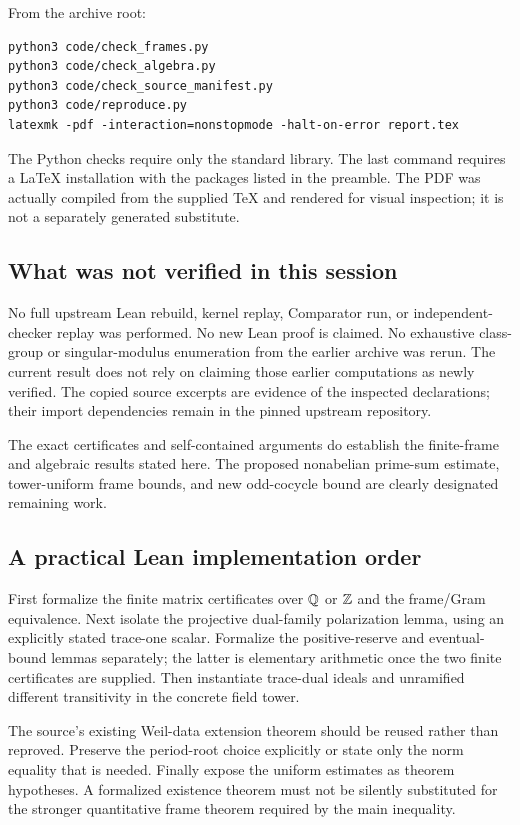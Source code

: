 From the archive root:
\begin{verbatim}
python3 code/check_frames.py
python3 code/check_algebra.py
python3 code/check_source_manifest.py
python3 code/reproduce.py
latexmk -pdf -interaction=nonstopmode -halt-on-error report.tex
\end{verbatim}
The Python checks require only the standard library. The last command requires a LaTeX installation with the packages listed in the preamble. The PDF was actually compiled from the supplied TeX and rendered for visual inspection; it is not a separately generated substitute.

\subsection{What was not verified in this session}

No full upstream Lean rebuild, kernel replay, Comparator run, or independent-checker replay was performed. No new Lean proof is claimed. No exhaustive class-group or singular-modulus enumeration from the earlier archive was rerun. The current result does not rely on claiming those earlier computations as newly verified. The copied source excerpts are evidence of the inspected declarations; their import dependencies remain in the pinned upstream repository.

The exact certificates and self-contained arguments do establish the finite-frame and algebraic results stated here. The proposed nonabelian prime-sum estimate, tower-uniform frame bounds, and new odd-cocycle bound are clearly designated remaining work.

\subsection{A practical Lean implementation order}

First formalize the finite matrix certificates over $\mathbb Q$ or $\mathbb Z$ and the frame/Gram equivalence. Next isolate the projective dual-family polarization lemma, using an explicitly stated trace-one scalar. Formalize the positive-reserve and eventual-bound lemmas separately; the latter is elementary arithmetic once the two finite certificates are supplied. Then instantiate trace-dual ideals and unramified different transitivity in the concrete field tower.

The source's existing Weil-data extension theorem should be reused rather than reproved. Preserve the period-root choice explicitly or state only the norm equality that is needed. Finally expose the uniform estimates as theorem hypotheses. A formalized existence theorem must not be silently substituted for the stronger quantitative frame theorem required by the main inequality.
